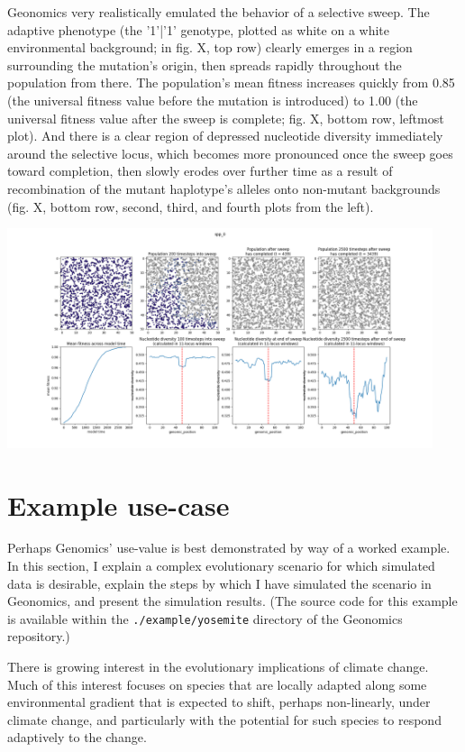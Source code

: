 ﻿\documentclass{article}
\begin{document}
Geonomics very realistically emulated the behavior of a selective sweep. The
adaptive phenotype (the '1'|'1' genotype, plotted as white
on a white environmental background; in fig. X, top row) clearly
emerges in a region surrounding the mutation's origin, then spreads rapidly
throughout the population from there. The population's mean fitness increases
quickly from 0.85 (the universal fitness value before the mutation is
introduced) to 1.00 (the universal fitness value after the sweep is complete;
fig. X, bottom row, leftmost plot). And there is a clear region of depressed
nucleotide diversity immediately around the selective locus, which becomes
more pronounced once the sweep goes toward completion, then slowly erodes
over further time as a result of recombination of the mutant haplotype's
alleles onto non-mutant backgrounds (fig. X, bottom row, second, third, and
fourth plots from the left).

\includegraphics[width=125mm]{./img/validation/sweep/sweep_results.png}


\section{Example use-case}

Perhaps Genomics' use-value is best demonstrated by way of a worked example.
In this section, I explain a complex evolutionary scenario for which 
simulated data is desirable, explain the steps by which I have simulated the
scenario in Geonomics, and present the simulation results. (The source code for
this example is available within the \texttt{./example/yosemite} directory
of the Geonomics repository.)

There is growing interest in the evolutionary implications of climate change.
Much of this interest focuses on species that are locally adapted along some
environmental gradient that is expected to shift, perhaps non-linearly,
under climate change, and particularly with the potential for such species
to respond adaptively to the change.
\end{document}
